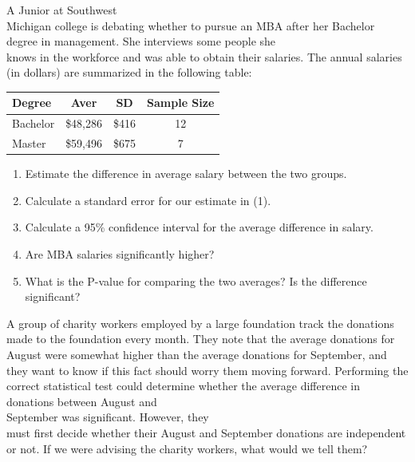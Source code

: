 \documentclass[11pt, chapterprefix=true]{scrbook}\usepackage[]{graphicx}\usepackage[]{color}
\begin{document}
\begin{exercises}
\begin{exercise}
\end{exercise}
\begin{solution}  %

\end{solution}

\begin{exercise}  %

A Junior at Southwest \\ Michigan college is debating whether to pursue an MBA after her Bachelor degree in management.  She interviews some people she \\ knows in the workforce and was able to obtain their salaries. The annual salaries (in dollars) are summarized in the following table:

\begin{tabular}{@{} lccc @{}} \hline
Degree & Aver & SD & Sample Size \\ \hline
Bachelor & \$48,286 & \$416 & 12 \\
Master   & \$59,496 & \$675 & 7 \\ \hline
\end{tabular}

\begin{enumerate}
  \item Estimate the difference in average salary between the two groups.
  \item Calculate a standard error for our estimate in (1).
  \item Calculate a 95\% confidence interval for the average difference in salary.
  \item Are MBA salaries significantly higher?
  \item What is the P-value for comparing the two averages? Is the difference significant?
\end{enumerate}
\end{exercise}  
\begin{solution}  %

\end{solution}

\begin{exercise}  %

A group of charity workers employed by a large foundation track the donations made to the foundation every month. They note that the average donations for August were somewhat higher than the average donations for September, and they want to know if this fact should worry them moving forward. Performing the correct statistical test could determine whether the average difference in donations between August and \\ September was significant. However, they \\ must first decide whether their August and  September donations are independent or not. If we were advising the charity workers, what would we tell them?
\end{exercise}
\begin{solution}  %



\end{solution}
\end{exercises}
\end{document}
